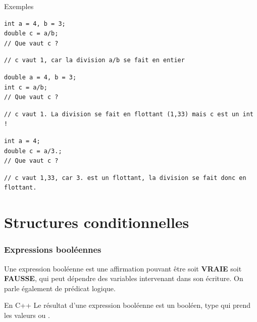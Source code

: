\begin{frame}[fragile]{Exemples}
\setbeamercovered{} 
\begin{verbatim}
int a = 4, b = 3;
double c = a/b;
// Que vaut c ?
\end{verbatim}
\vspace*{-1em}
\begin{verbatim}
// c vaut 1, car la division a/b se fait en entier
\end{verbatim}

\begin{verbatim}
double a = 4, b = 3;
int c = a/b; 
// Que vaut c ?
\end{verbatim}
\vspace*{-1em}
\begin{verbatim}
// c vaut 1. La division se fait en flottant (1,33) mais c est un int !
\end{verbatim}

\begin{verbatim}
int a = 4;
double c = a/3.;
// Que vaut c ?
\end{verbatim}
\vspace*{-1em}
\begin{verbatim}
// c vaut 1,33, car 3. est un flottant, la division se fait donc en flottant.
\end{verbatim}

\end{frame}

\section{Structures conditionnelles}

\begin{frame}
	\frametitle{Expressions booléennes}
	Une expression booléenne est une affirmation pouvant être soit \textbf{VRAIE} soit \textbf{FAUSSE}, qui peut dépendre des variables intervenant dans son écriture. On parle également de prédicat logique.
	\vfill
	\begin{block}{En C++}
		Le résultat d'une expression booléenne est un booléen, type  qui prend les valeurs  ou .
	\end{block}

\end{frame}

